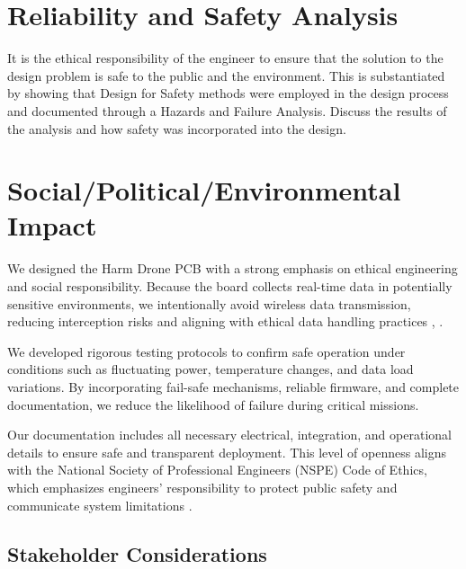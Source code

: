 \documentclass[12pt]{article}
\begin{document}
\section{Reliability and Safety Analysis}
It is the ethical responsibility of the engineer to ensure that the solution to the design problem is safe to the public and the environment. This is substantiated by showing that Design for Safety methods were employed in the design process and documented through a Hazards and Failure Analysis. Discuss the results of the analysis and how safety was incorporated into the design.

\section{Social/Political/Environmental Impact}

\par We designed the Harm Drone PCB with a strong emphasis on ethical engineering and social responsibility. Because the board collects real-time data in potentially sensitive environments, we intentionally avoid wireless data transmission, reducing interception risks and aligning with ethical data handling practices \cite{ieee_ethics}, \cite{ccpa}.

\par We developed rigorous testing protocols to confirm safe operation under conditions such as fluctuating power, temperature changes, and data load variations. By incorporating fail-safe mechanisms, reliable firmware, and complete documentation, we reduce the likelihood of failure during critical missions.

\par Our documentation includes all necessary electrical, integration, and operational details to ensure safe and transparent deployment. This level of openness aligns with the National Society of Professional Engineers (NSPE) Code of Ethics, which emphasizes engineers' responsibility to protect public safety and communicate system limitations \cite{nspe2020}.

\subsection{Stakeholder Considerations}
\end{document}
